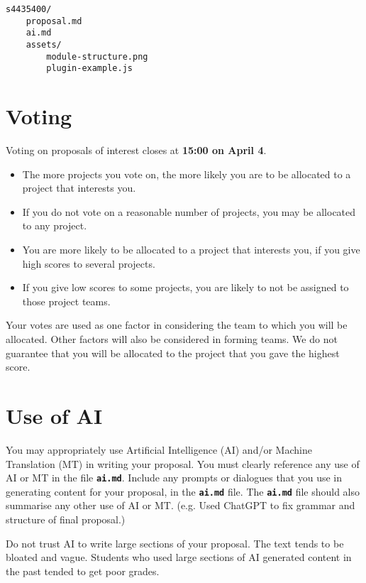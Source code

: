 \documentclass{csse4400}
\begin{document}
\begin{minipage}{\textwidth}
\begin{verbatim}
s4435400/
    proposal.md
    ai.md
    assets/
        module-structure.png
        plugin-example.js
\end{verbatim}
\end{minipage}


\section{Voting}
Voting on proposals of interest closes at \textbf{15:00 on April 4}.

\begin{itemize}
    \item The more projects you vote on, the more likely you are to be allocated to a project that interests you.
    \item If you do not vote on a reasonable number of projects, you may be allocated to any project.
    \item You are more likely to be allocated to a project that interests you,
          if you give high scores to several projects.
    \item If you give low scores to some projects, you are likely to not be assigned to those project teams.
\end{itemize}

\noindent
Your votes are used as one factor in considering the team to which you will be allocated.
Other factors will also be considered in forming teams.
We do not guarantee that you will be allocated to the project that you gave the highest score.


\section{Use of AI}
You may appropriately use Artificial Intelligence (AI) and/or Machine Translation (MT) in writing your proposal.
You must clearly reference any use of AI or MT in the file \textbf{\texttt{ai.md}}.
Include any prompts or dialogues that you use in generating content for your proposal, in the \textbf{\texttt{ai.md}} file.
The \textbf{\texttt{ai.md}} file should also summarise any other use of AI or MT.
(e.g. Used ChatGPT to fix grammar and structure of final proposal.)

Do not trust AI to write large sections of your proposal.
The text tends to be bloated and vague.
Students who used large sections of AI generated content in the past tended to get poor grades.
\end{document}
